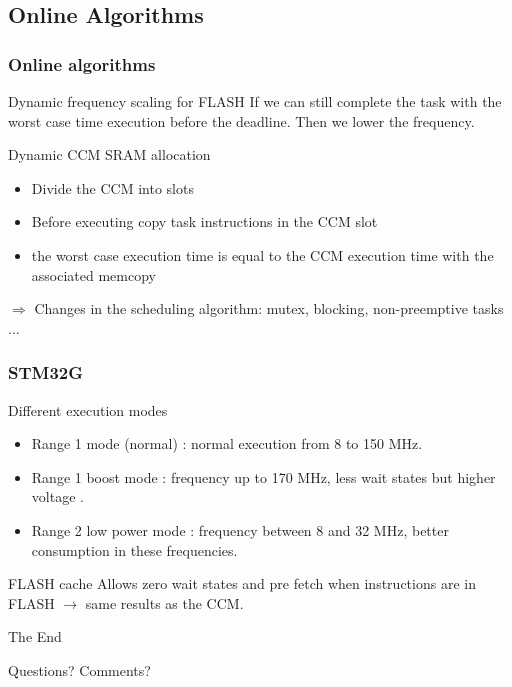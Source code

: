 \documentclass[
	11pt, %
]{beamer}
\begin{document}
\subsection{Online Algorithms}

\begin{frame}
	\frametitle{Online algorithms}
	\begin{block}{Dynamic frequency scaling for FLASH}
		If we can still complete the task with the worst case time execution before the deadline. Then we lower the frequency. 
	\end{block}
	\begin{block}{Dynamic CCM SRAM allocation}
		\begin{itemize}
			\item Divide the CCM into slots
			\item Before executing copy task instructions in the CCM slot
			\item the worst case execution time is equal to the CCM execution time with the associated memcopy
			
		\end{itemize}
		$\Rightarrow$ Changes in the scheduling algorithm: mutex, blocking, non-preemptive tasks $\ldots$

	\end{block}
\end{frame}

\begin{frame}
	\frametitle{STM32G}
	\begin{block}{Different execution modes}
		\begin{itemize}
			\item Range 1 mode (normal) : normal execution from 8 to 150 MHz.
			\item Range 1 boost mode : frequency up to 170 MHz, less wait states but higher voltage .
			\item Range 2 low power mode : frequency between 8 and 32 MHz, better consumption in these frequencies.
		\end{itemize}
	\end{block}
	\begin{block}{FLASH cache}
		Allows zero wait states and pre fetch when instructions are in FLASH $\rightarrow$ same results as the CCM.
	\end{block}
\end{frame}


\begin{frame}[plain] %
	\begin{center}
		{\Huge The End}
		
		\bigskip\bigskip %
		
		{\LARGE Questions? Comments?}
	\end{center}
\end{frame}

\end{document}
